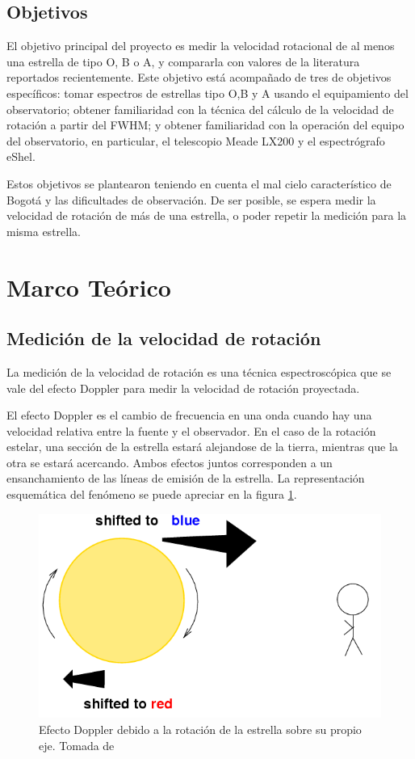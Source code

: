 \documentclass[notitlepage,letterpaper,12pt]{article} %
\begin{document}
\subsection*{Objetivos}
El objetivo principal del proyecto es medir la velocidad rotacional de al menos una estrella de tipo O, B o A, y compararla con valores de la literatura reportados recientemente.
Este objetivo está acompañado de tres de objetivos específicos: tomar espectros de estrellas tipo O,B y A usando el equipamiento del observatorio; obtener familiaridad con la técnica del cálculo de la velocidad de rotación a partir del FWHM; y obtener familiaridad con la operación del equipo del observatorio, en particular, el telescopio Meade LX200 y el espectrógrafo eShel.

Estos objetivos se plantearon teniendo en cuenta el mal cielo característico de Bogotá y las dificultades de observación. De ser posible, se espera medir la velocidad de rotación de más de una estrella, o poder repetir la medición para la misma estrella.

\section{Marco Teórico}
\subsection*{Medición de la velocidad de rotación}
La medición de la velocidad de rotación es una técnica espectroscópica que se vale del efecto Doppler para medir la velocidad de rotación proyectada.

El efecto Doppler es el cambio de frecuencia en una onda cuando hay una velocidad relativa entre la fuente y el observador. En el caso de la rotación estelar, una sección de la estrella estará alejandose de la tierra, mientras que la otra se estará acercando. Ambos efectos juntos corresponden a un ensanchamiento de las líneas de emisión de la estrella.
La representación esquemática del fenómeno se puede apreciar en la figura \ref{doppler}.

\begin{figure}[h!]
  \centering
   \includegraphics[scale= 0.5]{doppler.png}
  \caption{Efecto Doppler debido a la rotación de la estrella sobre su propio eje. Tomada de \cite{doppler} }
  \label{doppler}
\end{figure}
\end{document}
